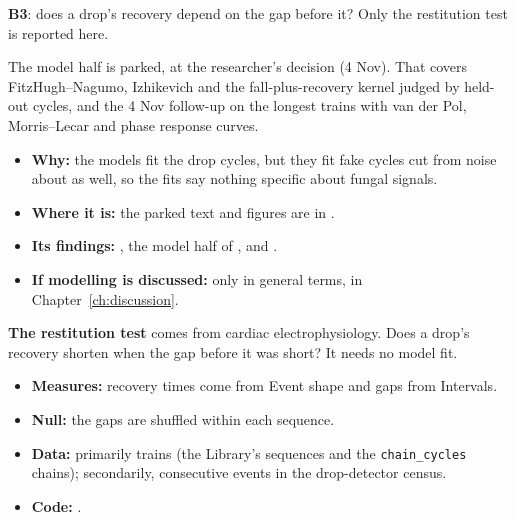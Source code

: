 \begin{instructions}
\textbf{B3}: does a drop's recovery depend on the gap before it? Only the restitution test is reported here.

The model half is parked, at the researcher's decision (4 Nov). That covers FitzHugh--Nagumo, Izhikevich and the
fall-plus-recovery kernel judged by held-out cycles, and the 4 Nov follow-up on the longest trains with van der Pol,
Morris--Lecar and phase response curves.
\begin{itemize}
  \item \textbf{Why:} the models fit the drop cycles, but they fit fake cycles cut from noise about as well, so the fits
        say nothing specific about fungal signals.
  \item \textbf{Where it is:} the parked text and figures are in .
  \item \textbf{Its findings:} , the model half of
        , and
        .
  \item \textbf{If modelling is discussed:} only in general terms, in Chapter~\ref{ch:discussion}.
\end{itemize}

\textbf{The restitution test} comes from cardiac electrophysiology. Does a drop's recovery shorten when the gap before
it was short? It needs no model fit.
\begin{itemize}
  \item \textbf{Measures:} recovery times come from Event shape and gaps from Intervals.
  \item \textbf{Null:} the gaps are shuffled within each sequence.
  \item \textbf{Data:} primarily trains (the Library's sequences and the \texttt{chain\_cycles} chains); secondarily,
        consecutive events in the drop-detector census.
  \item \textbf{Code:} .
\end{itemize}
\end{instructions}

